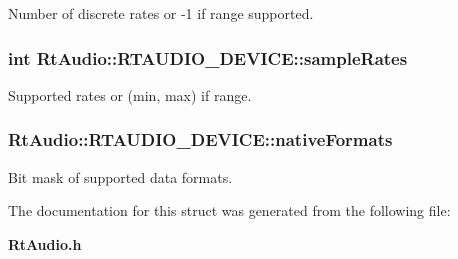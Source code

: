 Number of discrete rates or -1 if range supported. 
\subsubsection{\setlength{\rightskip}{0pt plus 5cm}int Rt\-Audio::RTAUDIO\_\-DEVICE::sample\-Rates}\label{structRtAudio_1_1RTAUDIO__DEVICE_m11}


Supported rates or (min, max) if range. 
\subsubsection{ Rt\-Audio::RTAUDIO\_\-DEVICE::native\-Formats}\label{structRtAudio_1_1RTAUDIO__DEVICE_m12}


Bit mask of supported data formats. 

The documentation for this struct was generated from the following file:\begin{CompactItemize}
\item 
{\bf Rt\-Audio.h}\end{CompactItemize}
